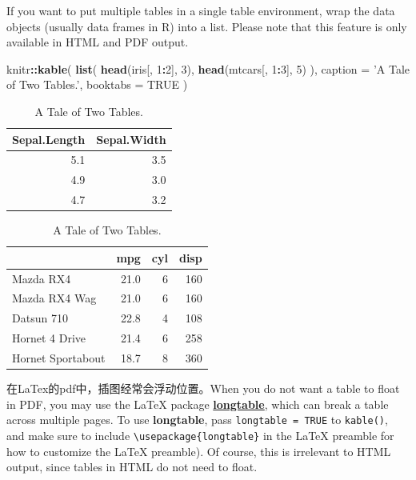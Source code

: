 \documentclass[]{article}
\newenvironment{Shaded}{\begin{snugshade}}{\end{snugshade}}
\newcommand{\DataTypeTok}[1]{\textcolor[rgb]{0.13,0.29,0.53}{#1}}
\newcommand{\DecValTok}[1]{\textcolor[rgb]{0.00,0.00,0.81}{#1}}
\newcommand{\KeywordTok}[1]{\textcolor[rgb]{0.13,0.29,0.53}{\textbf{#1}}}
\newcommand{\NormalTok}[1]{#1}
\newcommand{\OperatorTok}[1]{\textcolor[rgb]{0.81,0.36,0.00}{\textbf{#1}}}
\newcommand{\OtherTok}[1]{\textcolor[rgb]{0.56,0.35,0.01}{#1}}
\newcommand{\StringTok}[1]{\textcolor[rgb]{0.31,0.60,0.02}{#1}}
\begin{document}
If you want to put multiple tables in a single table environment, wrap
the data objects (usually data frames in R) into a list. Please note
that this feature is only available in HTML and PDF output.

\begin{Shaded}
\begin{Highlighting}[]
\NormalTok{knitr}\OperatorTok{::}\KeywordTok{kable}\NormalTok{(}
  \KeywordTok{list}\NormalTok{(}
    \KeywordTok{head}\NormalTok{(iris[, }\DecValTok{1}\OperatorTok{:}\DecValTok{2}\NormalTok{], }\DecValTok{3}\NormalTok{),}
    \KeywordTok{head}\NormalTok{(mtcars[, }\DecValTok{1}\OperatorTok{:}\DecValTok{3}\NormalTok{], }\DecValTok{5}\NormalTok{)}
\NormalTok{  ),}
  \DataTypeTok{caption =} \StringTok{'A Tale of Two Tables.'}\NormalTok{, }\DataTypeTok{booktabs =} \OtherTok{TRUE}
\NormalTok{)}
\end{Highlighting}
\end{Shaded}

\begin{table}
\caption{\label{tab:table-multi}A Tale of Two Tables.}

\centering
\begin{tabular}[t]{rr}
\toprule
Sepal.Length & Sepal.Width\\
\midrule
5.1 & 3.5\\
4.9 & 3.0\\
4.7 & 3.2\\
\bottomrule
\end{tabular}
\centering
\begin{tabular}[t]{lrrr}
\toprule
  & mpg & cyl & disp\\
\midrule
Mazda RX4 & 21.0 & 6 & 160\\
Mazda RX4 Wag & 21.0 & 6 & 160\\
Datsun 710 & 22.8 & 4 & 108\\
Hornet 4 Drive & 21.4 & 6 & 258\\
Hornet Sportabout & 18.7 & 8 & 360\\
\bottomrule
\end{tabular}
\end{table}

在LaTex的pdf中，插图经常会浮动位置。When you do not want a table to
float in PDF, you may use the LaTeX package
\href{https://www.ctan.org/pkg/longtable}{\textbf{longtable},} which can
break a table across multiple pages. To use \textbf{longtable}, pass
\texttt{longtable\ =\ TRUE} to \texttt{kable()}, and make sure to
include \texttt{\textbackslash{}usepackage\{longtable\}} in the LaTeX
preamble for how to customize the LaTeX preamble). Of course, this is
irrelevant to HTML output, since tables in HTML do not need to float.
\end{document}
